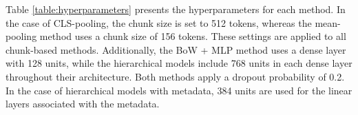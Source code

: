 Table \ref{table:hyperparameters} presents the hyperparameters for each method. In the case of CLS-pooling, the chunk size is set to 512 tokens, whereas the mean-pooling method uses a chunk size of 156 tokens. These settings are applied to all chunk-based methods. Additionally, the BoW + MLP method uses a dense layer with 128 units, while the hierarchical models include 768 units in each dense layer throughout their architecture. Both methods apply a dropout probability of 0.2. In the case of hierarchical models with metadata, 384 units are used for the linear layers associated with the metadata.


